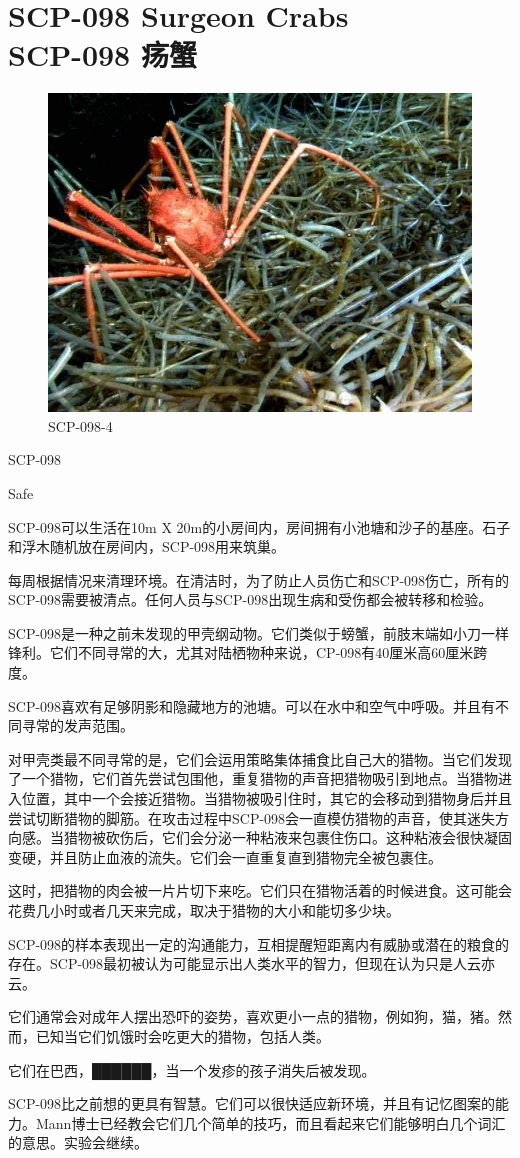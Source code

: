 \chapter[SCP-098 疡蟹]{
    SCP-098 Surgeon Crabs\\
    SCP-098 疡蟹
}

\label{chap:SCP-098}

\begin{figure}[H]
    \centering
    \includegraphics[width=0.5\linewidth]{images/SCP-098.jpg}
    \caption*{SCP-098-4}
\end{figure}

SCP-098

Safe

SCP-098可以生活在10m X 20m的小房间内，房间拥有小池塘和沙子的基座。石子和浮木随机放在房间内，SCP-098用来筑巢。

每周根据情况来清理环境。在清洁时，为了防止人员伤亡和SCP-098伤亡，所有的SCP-098需要被清点。任何人员与SCP-098出现生病和受伤都会被转移和检验。

SCP-098是一种之前未发现的甲壳纲动物。它们类似于螃蟹，前肢末端如小刀一样锋利。它们不同寻常的大，尤其对陆栖物种来说，CP-098有40厘米高60厘米跨度。

SCP-098喜欢有足够阴影和隐藏地方的池塘。可以在水中和空气中呼吸。并且有不同寻常的发声范围。

对甲壳类最不同寻常的是，它们会运用策略集体捕食比自己大的猎物。当它们发现了一个猎物，它们首先尝试包围他，重复猎物的声音把猎物吸引到地点。当猎物进入位置，其中一个会接近猎物。当猎物被吸引住时，其它的会移动到猎物身后并且尝试切断猎物的脚筋。在攻击过程中SCP-098会一直模仿猎物的声音，使其迷失方向感。当猎物被砍伤后，它们会分泌一种粘液来包裹住伤口。这种粘液会很快凝固变硬，并且防止血液的流失。它们会一直重复直到猎物完全被包裹住。

这时，把猎物的肉会被一片片切下来吃。它们只在猎物活着的时候进食。这可能会花费几小时或者几天来完成，取决于猎物的大小和能切多少块。

SCP-098的样本表现出一定的沟通能力，互相提醒短距离内有威胁或潜在的粮食的存在。SCP-098最初被认为可能显示出人类水平的智力，但现在认为只是人云亦云。

它们通常会对成年人摆出恐吓的姿势，喜欢更小一点的猎物，例如狗，猫，猪。然而，已知当它们饥饿时会吃更大的猎物，包括人类。

它们在巴西，██████，当一个发疹的孩子消失后被发现。

SCP-098比之前想的更具有智慧。它们可以很快适应新环境，并且有记忆图案的能力。Mann博士已经教会它们几个简单的技巧，而且看起来它们能够明白几个词汇的意思。实验会继续。
